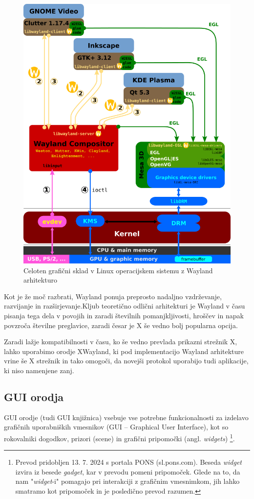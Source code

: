 \documentclass{article}
\begin{document}
\begin{figure}[H]
    \centering
    \includegraphics[width=0.75\linewidth]{Wayland_display_server_protocol}
    \caption{Celoten grafični sklad v Linux operacijskem sistemu z Wayland arhitekturo \autocite{fig:wayland}}
\end{figure}

Kot je že moč razbrati, Wayland ponuja preprosto nadaljno vzdrževanje, razvijanje in razširjevanje.Kljub teoretično odlični arhitekturi je Wayland v času pisanja tega dela v povojih in zaradi številnih pomanjkljivosti, hroščev in napak povzroča številne preglavice, zaradi česar je X še vedno bolj popularna opcija.

Zaradi lažje kompatibilnosti v času, ko še vedno prevlada prikazni strežnik X, lahko uporabimo orodje XWayland, ki pod implementacijo Wayland arhitekture vrine še X strežnik in tako omogoči, da novejši protokol uporabijo tudi aplikacije, ki niso namenjene zanj.

\subsection{GUI orodja}
GUI orodje (tudi GUI knjižnica) vsebuje vse potrebne funkcionalnosti za izdelavo grafičnih uporabniških vmesnikov (GUI -- Graphical User Interface), kot so rokovalniki dogodkov, prizori (scene) in grafični pripomočki (angl. \textit{widgets}) \footnote{Prevod pridobljen 13. 7. 2024 s portala PONS (sl.pons.com). Beseda \textit{widget} izvira iz besede \textit{gadget}, \autocite[Glej poglavje History]{wikiwidget} kar v prevodu pomeni pripomoček. Glede na to, da nam "\textit{widget}-i" pomagajo pri interakciji z grafičnim vmesnimkom, jih lahko smatramo kot pripomoček in je posledično prevod razumen.}. 
\end{document}
